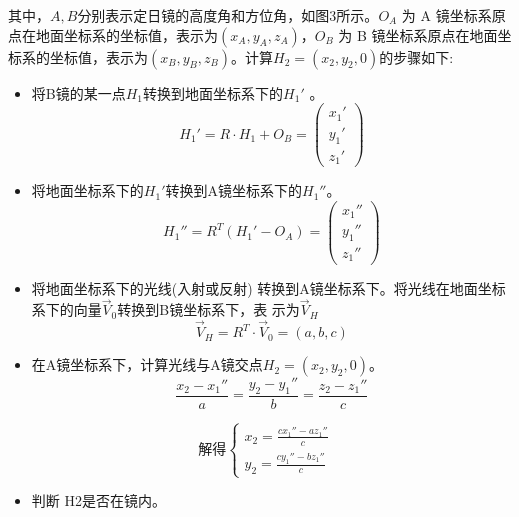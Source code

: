 \documentclass[withoutpreface,bwprint]{cumcmthesis}
\begin{document}
其中，$A,B$分别表示定日镜的高度角和方位角，如图3所示。$O_A$ 为 A 镜坐标系原点在地面坐标系的坐标值，表示为$(x_A,y_A,z_A)$，$O_B$ 为 B 镜坐标系原点在地面坐标系的坐标值，表示为$(x_B,y_B,z_B)$。计算$H_2 = ( x_2,y_2,0)$的步骤如下: 
\begin{itemize}
	\item [(1)] 
	将B镜的某一点$H_1$转换到地面坐标系下的${H_1}'$ 。
	\begin{equation}
	{H_1}'=R·H_1+O_B=\begin{pmatrix}
	{x_1}'\\
	{y_1}'\\
	{z_1}'
	\end{pmatrix}
	\end{equation}
	
	\item [(2)]
	将地面坐标系下的${H_1}'$转换到A镜坐标系下的${H_1}''$。
	\begin{equation}
	{H_1}'' =R^{T} ({H_1}'-O_A)=\begin{pmatrix}
	{x_1}''\\
	{y_1}''\\
	{z_1}''
	\end{pmatrix}
	\end{equation}
	
	\item [(3)]
	将地面坐标系下的光线(入射或反射) 转换到A镜坐标系下。将光线在地面坐标系下的向量$\vec{V}_0$转换到B镜坐标系下，表
	示为$\vec{V}_H$
	\begin{equation}
	\vec{V}_H =R^{T} ·\vec{V}_0=(a,b,c)
	\end{equation}
	
	\item [(4)]
	在A镜坐标系下，计算光线与A镜交点$H_2=(x_2,y_2,0)$。
	\begin{equation}
	\frac{x_2-{x_1}''}{a} =\frac{y_2-{y_1}''}{b} =\frac{z_2-{z_1}''}{c} 
	\end{equation}
	
	\begin{equation}
	\text{解得}
	\begin{cases}
	x_2=\displaystyle\frac{c{x_1}''-a{z_1}''}{c} &\\
	y_2=\displaystyle\frac{c{y_1}''-b{z_1}''}{c} &
	\end{cases}
	\end{equation}
	
	\item [(5)]
	判断 H2是否在镜内。
   \end{itemize}
\end{document}
